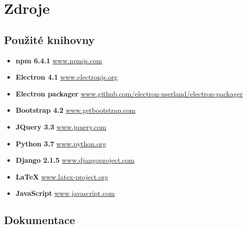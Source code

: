 \hypertarget{zdroje}{%
\section{Zdroje}\label{zdroje}}

\hypertarget{pouux17eituxe9-knihovny}{%
\subsection{Použité knihovny}\label{pouux17eituxe9-knihovny}}

\begin{itemize}
\tightlist
\item
  \textbf{npm 6.4.1} \href{https://www.npmjs.com/}{www.npmjs.com}
\item
  \textbf{Electron 4.1}
  \href{https://electronjs.org/}{www.electronjs.org}
\item
  \textbf{Electron packager}
  \href{https://github.com/electron-userland/electron-packager}{www.github.com/electron-userland/electron-packager}
\item
  \textbf{Bootstrap 4.2}
  \href{https://getbootstrap.com/}{www.getbootstrap.com}
\item
  \textbf{JQuery 3.3} \href{https://jquery.com/}{www.jquery.com}
\item
  \textbf{Python 3.7} \href{https://www.python.org/}{www.python.org}
\item
  \textbf{Django 2.1.5}
  \href{https://www.djangoproject.com/}{www.djangoproject.com}
\item
  \textbf{LaTeX}
  \href{https://www.latex-project.org/}{www.latex-project.org}
\item
  \textbf{JavaScript}
  \href{https://www.javascript.com}{www.javascript.com}
\end{itemize}

\hypertarget{dokumentace}{%
\subsection{Dokumentace}\label{dokumentace}}

